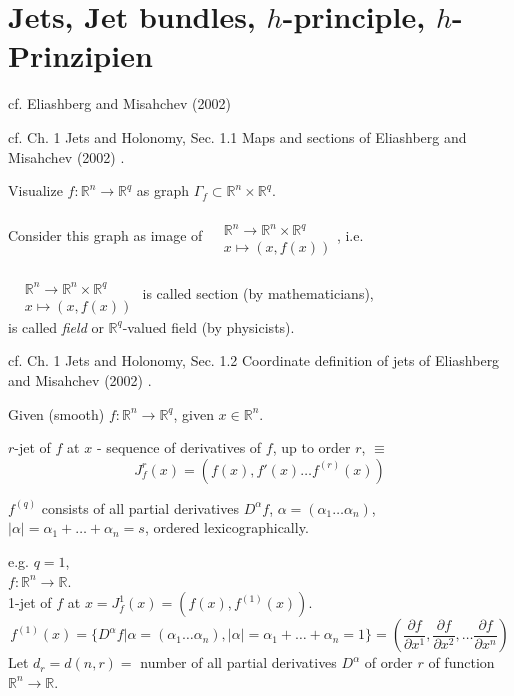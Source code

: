 \part{Jets, Jet bundles, $h$-principle, $h$-Prinzipien}


cf. Eliashberg and Misahchev (2002) \cite{dgdt:ElMi2002}

cf. Ch. 1 Jets and Holonomy, Sec. 1.1 Maps and sections of Eliashberg and Misahchev (2002) \cite{dgdt:ElMi2002}.  

Visualize $f:\mathbb{R}^n \to \mathbb{R}^q$ as graph $\Gamma_f \subset \mathbb{R}^n \times \mathbb{R}^q$.  

Consider this graph as image of $\begin{aligned} & \quad \\ 
	& \mathbb{R}^n \to \mathbb{R}^n \times \mathbb{R}^q \\
	& x \mapsto (x,f(x)) \end{aligned}$, i.e. 

$\begin{aligned} & \quad \\ 
	& \mathbb{R}^n \to \mathbb{R}^n \times \mathbb{R}^q \\
	& x \mapsto (x,f(x)) \end{aligned}$ is called section (by mathematicians), \\
is called \emph{field} or $\mathbb{R}^q$-valued field (by physicists).  

cf. Ch. 1 Jets and Holonomy, Sec. 1.2 Coordinate definition of jets of Eliashberg and Misahchev (2002) \cite{dgdt:ElMi2002}.  

\begin{definition}[$r$-jet]
Given (smooth) $f: \mathbb{R}^n \to \mathbb{R}^q$, given $x\in \mathbb{R}^n$.  

$r$-jet of $f$ at $x$ - sequence of derivatives of $f$, up to order $r$, $\equiv$ 
\begin{equation}
J^r_f(x) = (f(x),f'(x) \dots f^{(r)}(x) )
\end{equation}
\end{definition}

$f^{(q)}$ consists of all partial derivatives $D^{\alpha}f$, $\alpha= (\alpha_1\dots \alpha_n)$, $|\alpha| = \alpha_1 + \dots + \alpha_n =s$, ordered lexicographically.  

e.g. $q=1$, \\
$f: \mathbb{R}^n \to \mathbb{R}$.   \\
1-jet of $f$ at $x = J_f^1(x) = (f(x), f^{(1)}(x))$.  
\[
f^{(1)}(x) = \lbrace D^{\alpha}f| \alpha = (\alpha_1 \dots \alpha_n), |\alpha| = \alpha_1  + \dots + \alpha_n  =1 \rbrace = \left( \frac{ \partial f}{ \partial x^1 }, \frac{ \partial f}{ \partial x^2 } , \dots \frac{ \partial f}{ \partial x^n } \right)
\]
Let $d_r = d(n,r) = $ number of all partial derivatives $D^{\alpha}$ of order $r$ of function $\mathbb{R}^n \to \mathbb{R}$.  

